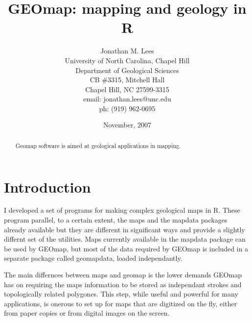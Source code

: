 \documentclass{article}
\begin{document}








\author{Jonathan M. Lees\\
University of North Carolina, Chapel Hill\\
Department of Geological Sciences\\
CB \#3315, Mitchell Hall\\
Chapel Hill, NC  27599-3315\\
email: jonathan.lees@unc.edu\\
ph: (919) 962-0695
}
\title{GEOmap: mapping and geology in R}
\date{November, 2007}

\maketitle

\begin{abstract}
Geomap software is aimed at geological applications in mapping.
\end{abstract}

\section{Introduction}
I developed a set of programs for making complex geological maps in R.
These program parallel, to a certain extent, the maps and the mapdata 
packages already available but they are different in significant ways and 
provide a slightly differnt set of the utilities.
Maps currently available in the mapdata package can be used
by GEOmap, but most of the data required by 
GEOmap is included in a separate package called geomapdata,
loaded independantly. 

The main differnces between maps and geomap is the lower demands
GEOmap has on requiring the maps information to be stored as independant 
strokes and topologically related polygones.  This step, while useful
and powerful for many applications, is onerous to set up for 
maps that are digitized on the fly, either from paper 
copies or from digital images on the screen.
\end{document}
